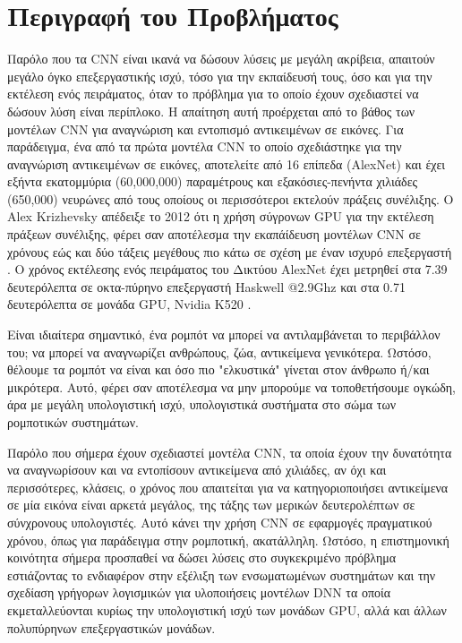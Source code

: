 \section{Περιγραφή του Προβλήματος}
\label{section:problem_description}

Παρόλο που τα CΝΝ είναι ικανά να δώσουν λύσεις με μεγάλη ακρίβεια, απαιτούν
μεγάλο όγκο επεξεργαστικής ισχύ, τόσο για την εκπαίδευσή τους, όσο και για την
εκτέλεση ενός πειράματος, όταν το πρόβλημα για το οποίο έχουν
σχεδιαστεί να δώσουν λύση είναι περίπλοκο. Η απαίτηση αυτή προέρχεται από το βάθος
των μοντέλων CNN για αναγνώριση και εντοπισμό αντικειμένων σε εικόνες.
Για παράδειγμα, ένα από τα πρώτα μοντέλα CNN το οποίο σχεδιάστηκε για την
αναγνώριση αντικειμένων σε εικόνες, αποτελείτε από 16 επίπεδα (AlexNet)
και έχει εξήντα εκατομμύρια (60,000,000) παραμέτρους και
εξακόσιες-πενήντα χιλιάδες (650,000) νευρώνες από τους οποίους οι περισσότεροι
εκτελούν πράξεις συνέλιξης. Ο Alex Krizhevsky απέδειξε το 2012 ότι η χρήση
σύγρονων GPU για την εκτέλεση πράξεων συνέλιξης, φέρει σαν αποτέλεσμα την
εκαπάίδευση μοντέλων CNN σε χρόνους εώς και δύο τάξεις μεγέθους πιο κάτω σε σχέση
με έναν ισχυρό επεξεργαστή \cite{NIPS2012_4824}. Ο χρόνος εκτέλεσης ενός πειράματος του Δικτύου AlexNet
έχει μετρηθεί στα 7.39 δευτερόλεπτα σε οκτα-πύρηνο επεξεργαστή Haskwell @2.9Ghz
και στα 0.71 δευτερόλεπτα σε μονάδα GPU, Nvidia K520 \cite{abuzaidoptimizing}.

Είναι ιδιαίτερα σημαντικό, ένα ρομπότ να μπορεί να αντιλαμβάνεται το περιβάλλον
του; να μπορεί να αναγνωρίζει ανθρώπους, ζώα, αντικείμενα γενικότερα. Ωστόσο,
θέλουμε τα ρομπότ να είναι και όσο πιο "ελκυστικά" γίνεται στον άνθρωπο ή/και μικρότερα.
Αυτό, φέρει σαν αποτέλεσμα να μην μπορούμε να τοποθετήσουμε ογκώδη, άρα με μεγάλη
υπολογιστική ισχύ, υπολογιστικά συστήματα στο σώμα των ρομποτικών συστημάτων.

Παρόλο που σήμερα έχουν σχεδιαστεί μοντέλα CNN, τα οποία έχουν την δυνατότητα να
αναγνωρίσουν και να εντοπίσουν αντικείμενα από χιλιάδες, αν όχι και περισσότερες,
κλάσεις, ο χρόνος που απαιτείται για να κατηγοριοποιήσει αντικείμενα σε μία εικόνα
είναι αρκετά μεγάλος, της τάξης των μερικών δευτερολέπτων σε σύνχρονους υπολογιστές.
Αυτό κάνει την χρήση CNN σε εφαρμογές πραγματικού χρόνου, όπως για παράδειγμα
στην ρομποτική, ακατάλληλη.
Ωστόσο, η επιστημονική κοινότητα σήμερα προσπαθεί να δώσει λύσεις στο συγκεκριμένο
πρόβλημα εστιάζοντας το ενδιαφέρον στην εξέλιξη των ενσωματωμένων συστημάτων
και την σχεδίαση γρήγορων λογισμικών για υλοποιήσεις μοντέλων DNN τα οποία
εκμεταλλεύονται κυρίως την υπολογιστική ισχύ των μονάδων GPU, αλλά και άλλων
πολυπύρηνων επεξεργαστικών μονάδων.
